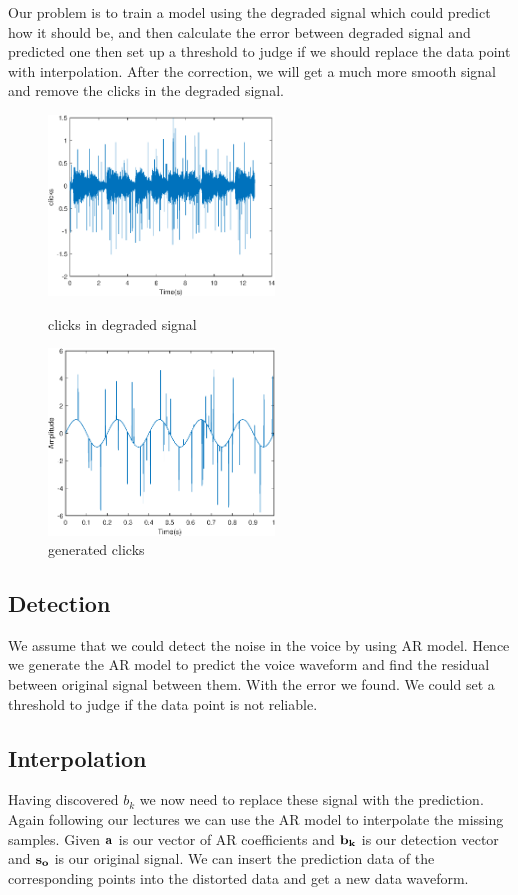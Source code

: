 \documentclass[11pt, a4paper]{article}
\begin{document}
 Our problem is to train a model using the degraded signal which could predict how it should be, and then calculate the error between degraded signal and predicted one then set up a threshold to judge if we should replace the data point with interpolation. After the correction, we will get a much more smooth signal and remove the clicks in the degraded signal.
 
\begin{figure}[htbp]
 	\centering
 	\begin{minipage}[t]{0.48\textwidth}
 		\centering
 		\includegraphics[width=6cm]{fig/fig1}
 		\caption{clicks in degraded signal}
 		\label{fig1}
 	\end{minipage}
 	\begin{minipage}[t]{0.48\textwidth}
 		\centering
 		\includegraphics[width=6cm]{fig/fig2}
 		\caption{generated clicks}
 		\label{fig2}
 	\end{minipage}
\end{figure}
 
 
 \subsection{Detection}
We assume that we could detect the noise in the voice by using AR model. Hence we generate the AR model to predict the voice waveform and find the residual between original signal between them. With the error we found. We could set a threshold to judge if the data point is not reliable.
 
 \subsection{Interpolation}
 Having discovered $b_k$ we now need to replace these signal with the prediction. Again following our lectures we can use the AR model to interpolate the missing samples. Given ${\bf a}$ is our vector of AR coefficients and ${\bf b_k}$ is our detection vector and ${\bf s_o}$ is our original signal. We can insert the prediction data of the corresponding points into the distorted data and get a new data waveform.
 
\end{document}
